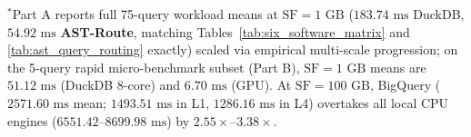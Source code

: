 \documentclass[10pt,a4paper]{article}
\begin{document}
\begin{table}[t!]
{\begin{tabular}{@{}llcccccccc@{}}
\bottomrule
\end{tabular}%
}
\vspace{2pt}
\parbox{\textwidth}{\scriptsize $^{*}$Part A reports full 75-query workload means at $\text{SF}=1\text{ GB}$ ($183.74\text{ ms}$ DuckDB, $54.92\text{ ms}$ \textbf{AST-Route}, matching Tables~\ref{tab:six_software_matrix} and \ref{tab:ast_query_routing} exactly) scaled via empirical multi-scale progression; on the 5-query rapid micro-benchmark subset (Part B), $\text{SF}=1\text{ GB}$ means are $51.12\text{ ms}$ (DuckDB 8-core) and $6.70\text{ ms}$ (GPU). At $\text{SF}=100\text{ GB}$, BigQuery ($2571.60\text{ ms}$ mean; $1493.51\text{ ms}$ in L1, $1286.16\text{ ms}$ in L4) overtakes all local CPU engines ($6551.42\text{--}8699.98\text{ ms}$) by $\mathbf{2.55\times\text{--}3.38\times}$.}
\end{table}
\end{document}

